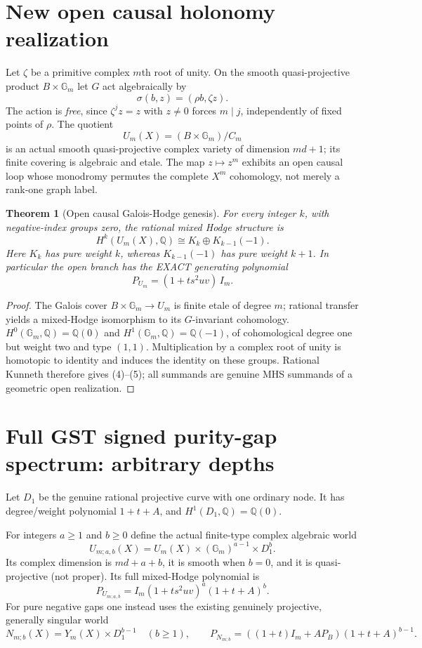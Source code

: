 \documentclass[11pt]{article}
\newtheorem{theorem}{Theorem}
\begin{document}
\section{New open causal holonomy realization}
Let $\zeta$ be a primitive complex $m$th root of unity.
On the smooth quasi-projective product
$B\times\mathbb G_m$ let $G$ act algebraically by
\[
    \sigma(b,z)=(\rho b,\zeta z).
\]
The action is \emph{free}, since $\zeta^jz=z$ with $z\ne0$
forces $m\mid j$, independently of fixed points of $\rho$.
The quotient
\[
 \boxed{\ U_m(X)=(B\times\mathbb G_m)/C_m\ }
 \tag{3}
\]
is an actual smooth quasi-projective complex variety of
dimension $md+1$; its finite covering is algebraic and etale.
The map $z\mapsto z^m$ exhibits an open causal loop whose
monodromy permutes the complete $X^m$ cohomology, not merely
a rank-one graph label.

\begin{theorem}[Open causal Galois-Hodge genesis]
For every integer $k$, with negative-index groups zero, the
rational mixed Hodge structure is
\[
 \boxed{H^k(U_m(X),\mathbb Q)
    \cong K_k\oplus K_{k-1}(-1).}
 \tag{4}
\]
Here $K_k$ has pure weight $k$, whereas
$K_{k-1}(-1)$ has pure weight $k+1$.
In particular the open branch has the EXACT generating polynomial
\[
 \boxed{P_{U_m}=(1+ts^2uv)\, I_m.}
 \tag{5}
\]
\end{theorem}
\begin{proof}
The Galois cover $B\times\mathbb G_m\to U_m$ is finite
etale of degree $m$; rational transfer yields a mixed-Hodge
isomorphism to its $G$-invariant cohomology.
$H^0(\mathbb G_m,\mathbb Q)=\mathbb Q(0)$ and
$H^1(\mathbb G_m,\mathbb Q)=\mathbb Q(-1)$, of
cohomological degree one but weight two and type $(1,1)$.
Multiplication by a complex root of unity is homotopic
to identity and induces the identity on these groups.
Rational Kunneth therefore gives (4)--(5); all summands
are genuine MHS summands of a geometric open realization.
\end{proof}

\section{Full GST signed purity-gap spectrum: arbitrary depths}
Let $D_1$ be the genuine rational projective curve with one
ordinary node. It has degree/weight polynomial $1+t+A$,
and $H^1(D_1,\mathbb Q)=\mathbb Q(0)$.

For integers $a\geq1$ and $b\geq0$ define the actual
finite-type complex algebraic world
\[
 U_{m;a,b}(X)=U_m(X)\times(\mathbb G_m)^{a-1}\times D_1^b.
 \tag{6}
\]
Its complex dimension is $md+a+b$, it is smooth when
$b=0$, and it is quasi-projective (not proper).
Its full mixed-Hodge polynomial is
\[
 \boxed{P_{U_{m;a,b}}=
       I_m(1+ts^2uv)^a(1+t+A)^b.}
 \tag{7}
\]
For pure negative gaps one instead uses the existing genuinely
projective, generally singular world
\[
 N_{m;b}(X)=Y_m(X)\times D_1^{b-1}\quad(b\geq1),
 \qquad
 \boxed{P_{N_{m;b}}=((1+t)I_m+A P_B)(1+t+A)^{b-1}.}
 \tag{8}
\]
\end{document}
